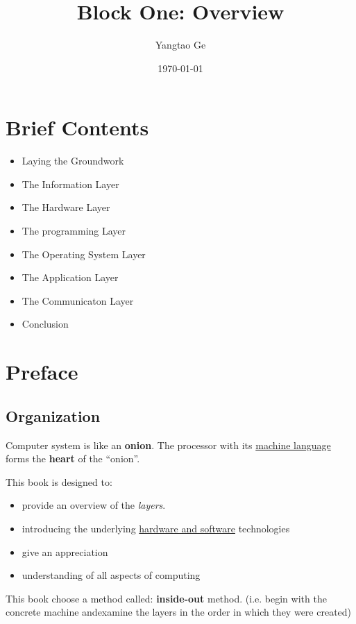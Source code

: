 \documentclass[12pt]{article}
\title{Block One: Overview}
\author{Yangtao Ge}
\date{\today}
\begin{document}
\maketitle

\section{Brief Contents}
\begin{itemize}
    \item Laying the Groundwork
    \item The Information Layer
    \item The Hardware Layer
    \item The programming Layer
    \item The Operating System Layer
    \item The Application Layer
    \item The Communicaton Layer
    \item Conclusion
\end{itemize}

\section{Preface}
\subsection{Organization}
Computer system is like an \textbf{onion}. The processor with its \underline{machine language} forms
the \textbf{heart} of the ``onion''.

This book is designed to:
\begin{itemize}
    \item provide an overview of the \textit{layers}.
    \item introducing the underlying \underline{hardware and software} technologies
    \item give an appreciation
    \item understanding of all aspects of computing
\end{itemize}

This book choose a method called: \textbf{inside-out} method. 
(i.e. begin with the concrete machine andexamine the layers in the order in which they were created)
\end{document}
